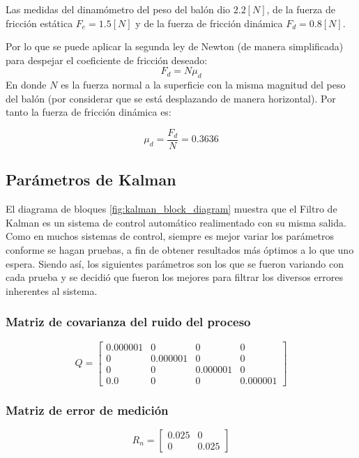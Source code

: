 	Las medidas del dinamómetro del peso del balón dio $2.2[N]$, de la fuerza de fricción estática $F_{e} = 1.5[N]$ y de la fuerza de fricción dinámica $F_{d} = 0.8[N]$. 

	Por lo que se puede aplicar la segunda ley de Newton (de manera simplificada) para despejar el coeficiente de fricción deseado:
\begin{equation}
F_d = N\mu_d 
\end{equation}
	En donde $N$ es la fuerza normal a la superficie con la misma magnitud del peso del balón (por considerar que se está desplazando de manera horizontal). Por tanto la fuerza de fricción dinámica es:
	
\begin{equation}
	\mu_d = \frac{F_d}{N}
	      = 0.3636		
	\label{eq:mu_d}
\end{equation}
	
		\subsection*{Parámetros de Kalman}
		El diagrama de bloques \ref{fig:kalman_block_diagram} muestra que el Filtro de Kalman es un sistema de control automático realimentado con su misma salida. Como en muchos sistemas de control, siempre es mejor variar los parámetros conforme se hagan pruebas, a fin de obtener resultados más óptimos a lo que uno espera. Siendo así, los siguientes parámetros son los que se fueron variando con cada prueba y se decidió que fueron los mejores para filtrar los diversos errores inherentes al sistema. 
		

		\subsubsection*{Matriz de covarianza del ruido del proceso}
\begin{equation}
Q = \begin{bmatrix}
0.000001 & 0 & 0 & 0\\ 
0        & 0.000001 & 0        & 0\\ 
0        & 0        & 0.000001 & 0\\ 
0.0      & 0        & 0        & 0.000001
\end{bmatrix}
\label{eq:process_noise_matrix}
\end{equation}

		\subsubsection*{Matriz de error de medición}
\begin{equation}
R_n = \begin{bmatrix}
0.025 & 0\\ 
0     & 0.025
\end{bmatrix}
\label{eq:noise_measurement}
\end{equation}

